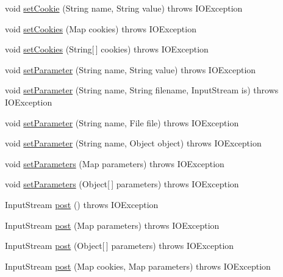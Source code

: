 \begin{DoxyCompactItemize}
\item 
void \hyperlink{classj_bittorrent_a_p_i_1_1_client_http_request_a958b7488fc0786851eb4376aed17782b}{setCookie} (String name, String value)  throws IOException 
\item 
void \hyperlink{classj_bittorrent_a_p_i_1_1_client_http_request_ae71b15d2913747523158c9e72354e14f}{setCookies} (Map cookies)  throws IOException 
\item 
void \hyperlink{classj_bittorrent_a_p_i_1_1_client_http_request_a5855b9145bbf09cf179c0dc69fa89058}{setCookies} (String\mbox{[}$\,$\mbox{]} cookies)  throws IOException 
\item 
void \hyperlink{classj_bittorrent_a_p_i_1_1_client_http_request_a93410ed6c53910e5d106ec450c637865}{setParameter} (String name, String value)  throws IOException 
\item 
void \hyperlink{classj_bittorrent_a_p_i_1_1_client_http_request_a97bf22e0a4053bc52e33e38b8e616830}{setParameter} (String name, String filename, InputStream is)  throws IOException 
\item 
void \hyperlink{classj_bittorrent_a_p_i_1_1_client_http_request_a1e193309e45fe3362f454948aec0233e}{setParameter} (String name, File file)  throws IOException 
\item 
void \hyperlink{classj_bittorrent_a_p_i_1_1_client_http_request_a90699712291d1398c7affe4d9269a457}{setParameter} (String name, Object object)  throws IOException 
\item 
void \hyperlink{classj_bittorrent_a_p_i_1_1_client_http_request_a76c4b629c7b032ec741dfd3d0f00de43}{setParameters} (Map parameters)  throws IOException 
\item 
void \hyperlink{classj_bittorrent_a_p_i_1_1_client_http_request_aa17bdf602ebfb5ac2dec1556e84883b6}{setParameters} (Object\mbox{[}$\,$\mbox{]} parameters)  throws IOException 
\item 
InputStream \hyperlink{classj_bittorrent_a_p_i_1_1_client_http_request_ae02b325689257902738d3f0a632ba430}{post} ()  throws IOException 
\item 
InputStream \hyperlink{classj_bittorrent_a_p_i_1_1_client_http_request_a6bfab5893e7b93ee7b05aabe2a4b81ac}{post} (Map parameters)  throws IOException 
\item 
InputStream \hyperlink{classj_bittorrent_a_p_i_1_1_client_http_request_ad402ced5c00cd025ab544f95121fbf7e}{post} (Object\mbox{[}$\,$\mbox{]} parameters)  throws IOException 
\item 
InputStream \hyperlink{classj_bittorrent_a_p_i_1_1_client_http_request_a0fd28a0cb6aaf88318874f7aaea31092}{post} (Map cookies, Map parameters)  throws IOException 

\end{DoxyCompactItemize}
